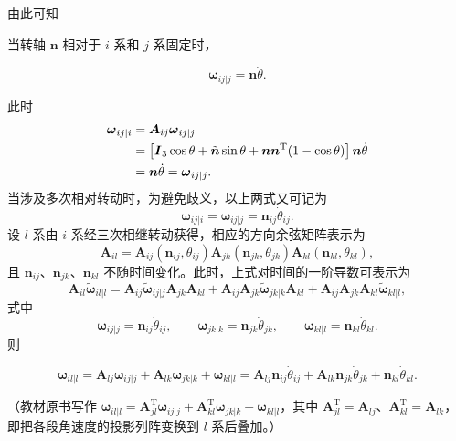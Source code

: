 由此可知
\begin{theorem}[固定转轴的角速度]
当转轴 $\boldsymbol{n}$ 相对于 $i$ 系和 $j$ 系固定时，

\[
\boldsymbol{\omega}_{ij|j}=\boldsymbol{n}\dot{\theta}.
\]
\end{theorem}
此时
\begin{align*}
\boldsymbol{\omega}_{ij|i} &= \boldsymbol{A}_{ij}\boldsymbol{\omega}_{ij|j}\notag\\
&= \left[\boldsymbol{I}_3\cos\theta+\tilde{\boldsymbol{n}}\sin\theta+\boldsymbol{n}\boldsymbol{n}^{\mathrm{T}}(1-\cos\theta)\right]\boldsymbol{n}\dot{\theta}\notag\\
&= \boldsymbol{n}\dot{\theta}=\boldsymbol{\omega}_{ij|j}.
\end{align*}
当涉及多次相对转动时，为避免歧义，以上两式又可记为
\[
\boldsymbol{\omega}_{ij|i}=\boldsymbol{\omega}_{ij|j}=\boldsymbol{n}_{ij}\dot{\theta}_{ij}.
\]
设 $l$ 系由 $i$ 系经三次相继转动获得，相应的方向余弦矩阵表示为
\[
\boldsymbol{A}_{il}=\boldsymbol{A}_{ij}(\boldsymbol{n}_{ij},\theta_{ij})\boldsymbol{A}_{jk}(\boldsymbol{n}_{jk},\theta_{jk})\boldsymbol{A}_{kl}(\boldsymbol{n}_{kl},\theta_{kl}),
\]
且 $\boldsymbol{n}_{ij}$、$\boldsymbol{n}_{jk}$、$\boldsymbol{n}_{kl}$ 不随时间变化。此时，上式对时间的一阶导数可表示为
\[
\boldsymbol{A}_{il}\tilde{\boldsymbol{\omega}}_{il|l}
=\boldsymbol{A}_{ij}\tilde{\boldsymbol{\omega}}_{ij|j}\boldsymbol{A}_{jk}\boldsymbol{A}_{kl}
+\boldsymbol{A}_{ij}\boldsymbol{A}_{jk}\tilde{\boldsymbol{\omega}}_{jk|k}\boldsymbol{A}_{kl}
+\boldsymbol{A}_{ij}\boldsymbol{A}_{jk}\boldsymbol{A}_{kl}\tilde{\boldsymbol{\omega}}_{kl|l},
\]
式中
\[
\boldsymbol{\omega}_{ij|j}=\boldsymbol{n}_{ij}\dot{\theta}_{ij},\qquad
\boldsymbol{\omega}_{jk|k}=\boldsymbol{n}_{jk}\dot{\theta}_{jk},\qquad
\boldsymbol{\omega}_{kl|l}=\boldsymbol{n}_{kl}\dot{\theta}_{kl}.
\]
则
\begin{theorem}[相继转动的角速度合成]
\[
\boldsymbol{\omega}_{il|l}
=\boldsymbol{A}_{lj}\boldsymbol{\omega}_{ij|j}+\boldsymbol{A}_{lk}\boldsymbol{\omega}_{jk|k}+\boldsymbol{\omega}_{kl|l}
=\boldsymbol{A}_{lj}\boldsymbol{n}_{ij}\dot{\theta}_{ij}+\boldsymbol{A}_{lk}\boldsymbol{n}_{jk}\dot{\theta}_{jk}+\boldsymbol{n}_{kl}\dot{\theta}_{kl}.
\]

（教材原书写作 $\boldsymbol{\omega}_{il|l}=\boldsymbol{A}_{jl}^{\mathrm{T}}\boldsymbol{\omega}_{ij|j}+\boldsymbol{A}_{kl}^{\mathrm{T}}\boldsymbol{\omega}_{jk|k}+\boldsymbol{\omega}_{kl|l}$，其中 $\boldsymbol{A}_{jl}^{\mathrm{T}}=\boldsymbol{A}_{lj}$、$\boldsymbol{A}_{kl}^{\mathrm{T}}=\boldsymbol{A}_{lk}$，即把各段角速度的投影列阵变换到 $l$ 系后叠加。）
\end{theorem}
